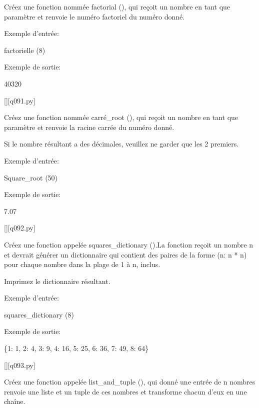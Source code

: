         \question
        Créez une fonction nommée factorial (), qui reçoit un nombre en tant que paramètre et renvoie le numéro factoriel du numéro donné.

Exemple d'entrée:

factorielle (8)

Exemple de sortie:

40320
        \par
        \renewcommand{\nomfichier}{q091.py}
        \begin{solution}
            \pythonfile{\chemincode \nomfichier}[][\nomfichier]
        \end{solution}
        

        \question
        Créez une fonction nommée carré\_root (), qui reçoit un nombre en tant que paramètre et renvoie la racine carrée du numéro donné.

Si le nombre résultant a des décimales, veuillez ne garder que les 2 premiers.

Exemple d'entrée:

Square\_root (50)

Exemple de sortie:

7.07
        \par
        \renewcommand{\nomfichier}{q092.py}
        \begin{solution}
            \pythonfile{\chemincode \nomfichier}[][\nomfichier]
        \end{solution}
        

        \question
        Créez une fonction appelée squares\_dictionary ().La fonction reçoit un nombre n et devrait générer un dictionnaire qui contient des paires de la forme (n: n * n) pour chaque nombre dans la plage de 1 à n, inclus.

Imprimez le dictionnaire résultant.

Exemple d'entrée:

squares\_dictionary (8)

Exemple de sortie:

\{1: 1, 2: 4, 3: 9, 4: 16, 5: 25, 6: 36, 7: 49, 8: 64\}
        \par
        \renewcommand{\nomfichier}{q093.py}
        \begin{solution}
            \pythonfile{\chemincode \nomfichier}[][\nomfichier]
        \end{solution}
        

        \question
        Créez une fonction appelée list\_and\_tuple (), qui donné une entrée de n nombres renvoie une liste et un tuple de ces nombres et transforme chacun d'eux en une chaîne.

